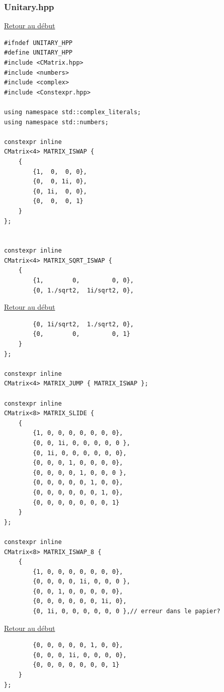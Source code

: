 {\begin{frame}[fragile]
\begin{verbatim}
\end{verbatim}
\end{frame}

\begin{frame}[fragile]
\label{Unitary.hpp}
\frametitle{Unitary.hpp}
\hyperlink{conclusion}{Retour au début}\newline
\begin{verbatim}
#ifndef UNITARY_HPP
#define UNITARY_HPP
#include <CMatrix.hpp>
#include <numbers>
#include <complex>
#include <Constexpr.hpp>

using namespace std::complex_literals;
using namespace std::numbers;

constexpr inline
CMatrix<4> MATRIX_ISWAP {
    {
        {1,  0,  0, 0},
        {0,  0, 1i, 0},
        {0, 1i,  0, 0},
        {0,  0,  0, 1}
    }
};


constexpr inline
CMatrix<4> MATRIX_SQRT_ISWAP {
    {
        {1,        0,         0, 0},
        {0, 1./sqrt2,  1i/sqrt2, 0},
\end{verbatim}
\end{frame}

\begin{frame}[fragile]
\hyperlink{conclusion}{Retour au début}\newline
\begin{verbatim}
        {0, 1i/sqrt2,  1./sqrt2, 0},
        {0,        0,         0, 1}
    }
};

constexpr inline
CMatrix<4> MATRIX_JUMP { MATRIX_ISWAP };

constexpr inline
CMatrix<8> MATRIX_SLIDE {
    {
        {1, 0, 0, 0, 0, 0, 0, 0},
        {0, 0, 1i, 0, 0, 0, 0, 0 },
        {0, 1i, 0, 0, 0, 0, 0, 0},
        {0, 0, 0, 1, 0, 0, 0, 0},
        {0, 0, 0, 0, 1, 0, 0, 0 },
        {0, 0, 0, 0, 0, 1, 0, 0},
        {0, 0, 0, 0, 0, 0, 1, 0},
        {0, 0, 0, 0, 0, 0, 0, 1}
    }
};

constexpr inline
CMatrix<8> MATRIX_ISWAP_8 {
    {
        {1, 0, 0, 0, 0, 0, 0, 0},
        {0, 0, 0, 0, 1i, 0, 0, 0 },
        {0, 0, 1, 0, 0, 0, 0, 0},
        {0, 0, 0, 0, 0, 0, 1i, 0},
        {0, 1i, 0, 0, 0, 0, 0, 0 },// erreur dans le papier?
\end{verbatim}
\end{frame}

\begin{frame}[fragile]
\hyperlink{conclusion}{Retour au début}\newline
\begin{verbatim}
        {0, 0, 0, 0, 0, 1, 0, 0},
        {0, 0, 0, 1i, 0, 0, 0, 0},
        {0, 0, 0, 0, 0, 0, 0, 1}
    }
};


\end{verbatim}
\end{frame}}
